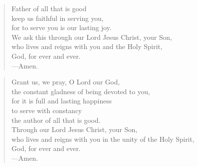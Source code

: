 \prayer

\setlength{\leftmargini}{\prayerleftmargini}

\begin{verse}
Father of all that is good\\
keep us faithful in serving you,\\
for to serve you is our lasting joy.\\
We ask this through our Lord Jesus Christ, your Son,\\
who lives and reigns with you and the Holy Spirit,\\
God, for ever and ever.\\
{\color{red}---\thinspace}Amen.
\end{verse}


\begin{verse}
Grant us, we pray, O Lord our God,\\
the constant gladness of being devoted to you,\\
for it is full and lasting happiness\\
to serve with constancy\\
the author of all that is good.\\
Through our Lord Jesus Christ, your Son,\\
who lives and reigns with you in the unity of the Holy Spirit,\\
God, for ever and ever.\\
{\color{red}---\thinspace}Amen.
\end{verse}

\setlength{\leftmargini}{\defleftmargini}